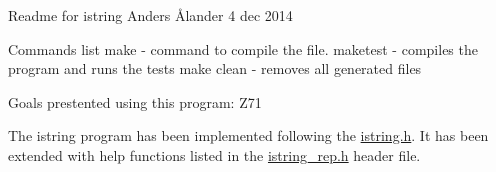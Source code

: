 Readme for istring Anders Ålander 4 dec 2014

Commands list make -\/ command to compile the file. maketest -\/ compiles the program and runs the tests make clean -\/ removes all generated files

Goals prestented using this program\-: Z71

The istring program has been implemented following the \hyperlink{istring_8h}{istring.\-h}. It has been extended with help functions listed in the \hyperlink{istring__rep_8h}{istring\-\_\-rep.\-h} header file. 